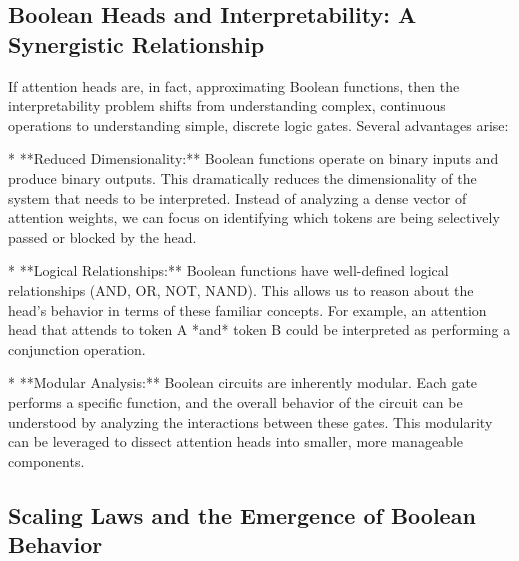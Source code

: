 \subsection{Boolean Heads and Interpretability: A Synergistic Relationship}













If attention heads are, in fact, approximating Boolean functions, then the interpretability problem shifts from understanding complex, continuous operations to understanding simple, discrete logic gates. Several advantages arise:













*   **Reduced Dimensionality:** Boolean functions operate on binary inputs and produce binary outputs. This dramatically reduces the dimensionality of the system that needs to be interpreted.  Instead of analyzing a dense vector of attention weights, we can focus on identifying which tokens are being selectively passed or blocked by the head.






*   **Logical Relationships:** Boolean functions have well-defined logical relationships (AND, OR, NOT, NAND). This allows us to reason about the head's behavior in terms of these familiar concepts.  For example, an attention head that attends to token A *and* token B could be interpreted as performing a conjunction operation.






*   **Modular Analysis:** Boolean circuits are inherently modular.  Each gate performs a specific function, and the overall behavior of the circuit can be understood by analyzing the interactions between these gates.  This modularity can be leveraged to dissect attention heads into smaller, more manageable components.













\subsection{Scaling Laws and the Emergence of Boolean Behavior}














